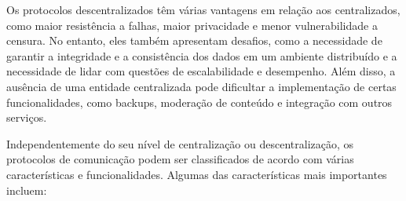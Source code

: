 
Os protocolos descentralizados têm várias vantagens em relação aos centralizados, como maior resistência a falhas, maior privacidade e menor vulnerabilidade a censura. No entanto, eles também apresentam desafios, como a necessidade de garantir a integridade e a consistência dos dados em um ambiente distribuído e a necessidade de lidar com questões de escalabilidade e desempenho. Além disso, a ausência de uma entidade centralizada pode dificultar a implementação de certas funcionalidades, como backups, moderação de conteúdo e integração com outros serviços.

Independentemente do seu nível de centralização ou descentralização, os protocolos de comunicação podem ser classificados de acordo com várias características e funcionalidades. Algumas das características mais importantes incluem:

